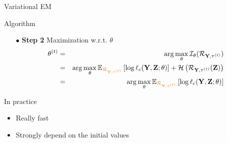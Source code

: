 \documentclass[compress,10pt]{beamer}
\newcommand{\bX}{\mathbf{Y}}
\newcommand{\Xall}{\mathbf{Y}}
\newcommand{\btau}{\mathbf{\tau}}
\newcommand{\bZ}{\mathbf{Z}}
\begin{document}

 \begin{frame}{Variational  EM}


\begin{block}{Algorithm}
\begin{enumerate}
 \item[$\bullet$]\textbf{Step 2} Maximization  w.r.t.  $\theta$
 \begin{eqnarray*}
 \theta^{(t)} &=& \arg \max_{\theta}   \mathcal{I}_{\theta}(\mathcal{R}_{\Xall,\btau^{(t)}}) \\
 &=&   \arg \max_{\theta} \mathbb{E}_{\color{dgreen}\mathcal{R}_{\Xall,\btau^{(t)}}} \left[\log \ell_c(\bX,\bZ;  \theta)   \right]  +   \mathcal{H}\left(\mathcal{R}_{\Xall,\btau^{(t)}}(\bZ)\right)\\
&=&  \arg \max_{\theta} \mathbb{E}_{\color{dgreen}\mathcal{R}_{\Xall,\btau^{(t)}}} \left[\log \ell_c(\bX,\bZ;  \theta)   \right]  
 \end{eqnarray*}
 
\end{enumerate}

 \end{block} 
 \end{frame}
\begin{frame}{In practice}
\begin{itemize}
\item Really fast
\item Strongly depend on the initial values
\end{itemize}

\end{frame}
 
\end{document}
